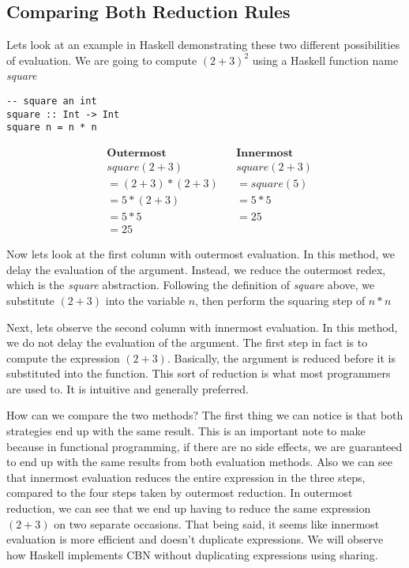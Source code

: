 \documentclass{article}
\begin{document}
\subsection{Comparing Both Reduction Rules}
\medskip\noindent
Lets look at an example in Haskell demonstrating these two different possibilities of evaluation. We are going to compute  ${(2+3)}^2$ using a Haskell function name \textit{square}

\begin{lstlisting}
-- square an int
square :: Int -> Int
square n = n * n
\end{lstlisting}
\noindent\begin{align*}
&\textbf{Outermost}  &  &\textbf{Innermost}  \\
&square (2+3)   &   &square (2+3)  \\
&=(2+3)*(2+3)   &   &=square (5)\\
&=5 * (2+3)   &    &=5 * 5  \\
&=5 * 5   &    &=25 \\
&=25   
\end{align*}

\medskip\noindent
Now lets look at the first column with outermost evaluation. In this method, we delay the evaluation of the argument. Instead, we reduce the outermost redex, which is the \textit{square} abstraction. Following the definition of \textit{square} above, we substitute $(2+3)$ into the variable $n$, then perform the squaring step of $n*n$

\medskip\noindent
Next, lets observe the second column with innermost evaluation. In this method, we do not delay the evaluation of the argument. The first step in fact is to compute the expression $(2+3)$. Basically, the argument is reduced before it is substituted into the function. This sort of reduction is what most programmers are used to. It is intuitive and generally preferred. 

\medskip\noindent
How can we compare the two methods? The first thing we can notice is that both strategies end up with the same result. This is an important note to make because in functional programming, if there are no side effects, we are guaranteed to end up with the same results from both evaluation methods. Also we can see that innermost evaluation reduces the entire expression in the three steps, compared to the four steps taken by outermost reduction. In outermost reduction, we can see that we end up having to reduce the same expression $(2+3)$ on two separate occasions. That being said, it seems like innermost evaluation is more efficient and doesn't duplicate expressions. We will observe how Haskell implements CBN without duplicating expressions using sharing.
\end{document}
